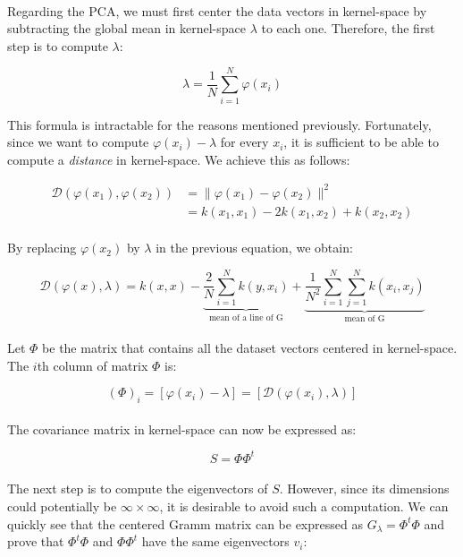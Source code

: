 \paragraph{}
Regarding the PCA, we must first center the data vectors in kernel-space by subtracting the global mean in kernel-space $\lambda$ to each one.
Therefore, the first step is to compute $\lambda$:

$$\lambda = \frac{1}{N}\sum_{i = 1}^{N} \varphi(x_i)$$

This formula is intractable for the reasons mentioned previously. Fortunately, since we want to
compute $\varphi(x_i) - \lambda$ for every $x_i$, it is sufficient to be able to compute a
\emph{distance} in kernel-space. We achieve this as follows:

\begin{align*}
\mathcal{D}(\varphi(x_1), \varphi(x_2)) &= \|\varphi(x_1) - \varphi(x_2)\|^2 \\
&= k(x_1, x_1) - 2k(x_1, x_2) +
k(x_2, x_2)
\end{align*}


\paragraph{}
By replacing $\varphi(x_2)$ by $\lambda$ in the previous equation, we obtain:

$$\mathcal{D}(\varphi(x), \lambda) = k(x, x) - \underbrace{\frac{2}{N}\sum_{i = 1}^N k(y,
x_i)}_{\text{mean of a line of G}} + \underbrace{\frac{1}{N^2}\sum_{i = 1}^{N}\sum_{j = 1}^{N} k(x_i, x_j)}_{\text{mean
of G}}$$

\paragraph{}
Let $\Phi$ be the matrix that contains all the dataset vectors centered in
kernel-space. The $i$th column of matrix $\Phi$ is:

$$(\Phi)_i = [\varphi(x_i) - \lambda] = [\mathcal{D}(\varphi(x_i), \lambda)]$$

\paragraph{} The covariance matrix in kernel-space can now be expressed as:

$$S = \Phi\Phi^t$$

\paragraph{} The next step is to compute the eigenvectors of $S$. However, since its dimensions could
potentially be
$\infty \times \infty$, it is desirable to avoid such a computation. We can quickly see that the centered Gramm
matrix can be expressed as $G_\lambda = \Phi^t\Phi$ and prove that $\Phi^t\Phi$ and $\Phi\Phi^t$ have the same
eigenvectors $v_i$:

